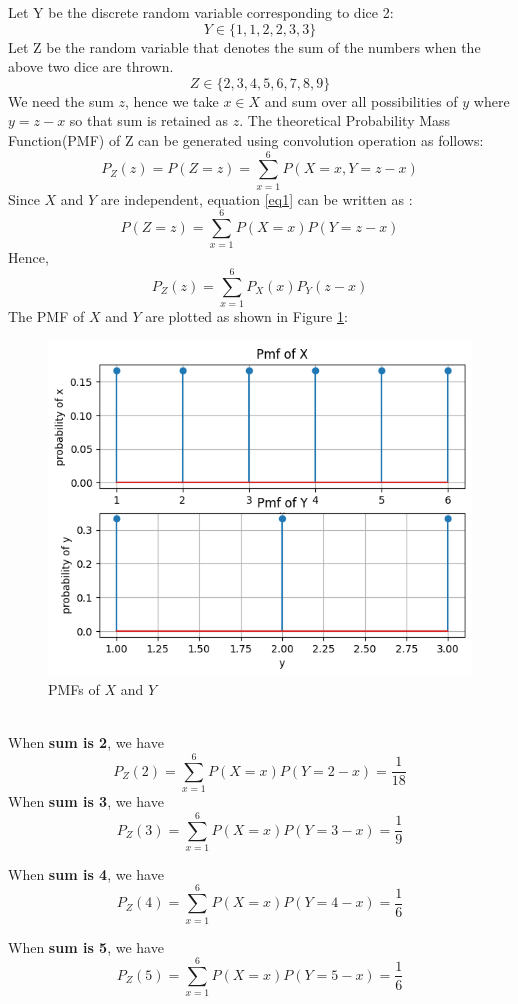 \documentclass[journal,12pt,twocolumn]{IEEEtran}
\begin{document}
{ Let Y be the discrete random variable corresponding to dice 2: \[ Y \in \{1,1,2,2,3,3\} \]}
Let Z be the random variable that denotes the sum of the numbers when the above two dice are thrown.\[ Z \in \{2,3,4,5,6,7,8,9\} \] {
We need the sum \(z\), hence we take \( x \in X\) and sum over all possibilities of \(y\) where \(y=z-x \) so that sum is retained as \(z\).
The theoretical Probability Mass Function(PMF)  of Z can be generated using convolution operation as follows:
}
\begin{equation}\label{eq1}
   P_Z(z)=P(Z=z)= \sum_{x=1}^{6} P(X=x,Y=z-x)
\end{equation}
Since \(X\) and \(Y\) are independent, equation \ref{eq1} can be written as :
\[ P(Z=z)= \sum_{x=1}^{6} P(X=x) P(Y=z-x)\]
Hence,
\begin{equation}\label{eq2}
    P_Z(z)= \sum_{x=1}^{6} P_X(x)P_Y(z-x)
\end{equation}
The PMF of \(X\) and \(Y\) are plotted as shown in Figure \ref{pmf}:
\begin{figure}[!]
    \centering
    \includegraphics[scale=0.6]{pmf.png}
    \caption{PMFs of \(X\) and \(Y\)}
    \label{pmf}
\end{figure}\\
When \textbf{sum is 2}, we have 
\[P_Z(2)= \sum_{x=1}^{6} P(X=x)P(Y=2-x)=\frac{1}{18}\]
When \textbf{sum is 3}, we have 
\[P_Z(3)= \sum_{x=1}^{6} P(X=x)P(Y=3-x)=\frac{1}{9}\]

When \textbf{sum is 4}, we have 
\[P_Z(4)= \sum_{x=1}^{6} P(X=x)P(Y=4-x)=\frac{1}{6}\]

When \textbf{sum is 5}, we have 
\[P_Z(5)= \sum_{x=1}^{6} P(X=x)P(Y=5-x)=\frac{1}{6}\]
\end{document}
